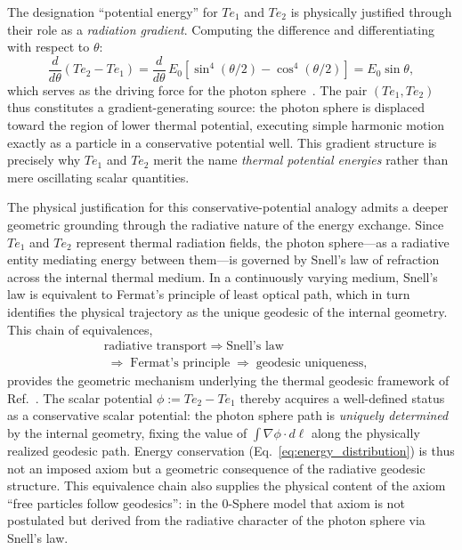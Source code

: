 \documentclass[%
 reprint,
 amsmath,amssymb,
 aps,
 prb,
]{revtex4-2}
\numberwithin{equation}{section}
\theoremstyle{definition}
\theoremstyle{remark}
\begin{document}
The designation ``potential energy'' for $Te_1$ and $Te_2$ is physically justified through their role as a \emph{radiation gradient}. Computing the difference and differentiating with respect to $\theta$:
\begin{equation}
\frac{d}{d\theta}(Te_2 - Te_1)
= \frac{d}{d\theta}\,E_0\!\left[\sin^4(\theta/2) - \cos^4(\theta/2)\right]
= E_0\sin\theta,
\label{eq:radiation_gradient}
\end{equation}
which serves as the driving force for the photon sphere~\cite{Hanamura_2018_01}. The pair $(Te_1, Te_2)$ thus constitutes a gradient-generating source: the photon sphere is displaced toward the region of lower thermal potential, executing simple harmonic motion exactly as a particle in a conservative potential well. This gradient structure is precisely why $Te_1$ and $Te_2$ merit the name \emph{thermal potential energies} rather than mere oscillating scalar quantities.

The physical justification for this conservative-potential analogy admits a deeper geometric grounding through the radiative nature of the energy exchange. Since $Te_1$ and $Te_2$ represent thermal radiation fields, the photon sphere---as a radiative entity mediating energy between them---is governed by Snell's law of refraction across the internal thermal medium. In a continuously varying medium, Snell's law is equivalent to Fermat's principle of least optical path, which in turn identifies the physical trajectory as the unique geodesic of the internal geometry. This chain of equivalences,
\begin{align}
&\text{radiative transport}
\;\Rightarrow\; \text{Snell's law} \nonumber\\
&\;\Rightarrow\; \text{Fermat's principle}
\;\Rightarrow\; \text{geodesic uniqueness},
\label{eq:snell_geodesic}
\end{align}
provides the geometric mechanism underlying the thermal geodesic framework of Ref.~\cite{Hanamura_2025_24}. The scalar potential $\phi := Te_2 - Te_1$ thereby acquires a well-defined status as a conservative scalar potential: the photon sphere path is \emph{uniquely determined} by the internal geometry, fixing the value of $\int \nabla\phi \cdot d\boldsymbol{\ell}$ along the physically realized geodesic path. Energy conservation (Eq.~\ref{eq:energy_distribution}) is thus not an imposed axiom but a geometric consequence of the radiative geodesic structure. This equivalence chain also supplies the physical content of the axiom ``free particles follow geodesics'': in the 0-Sphere model that axiom is not postulated but derived from the radiative character of the photon sphere via Snell's law.
\end{document}
